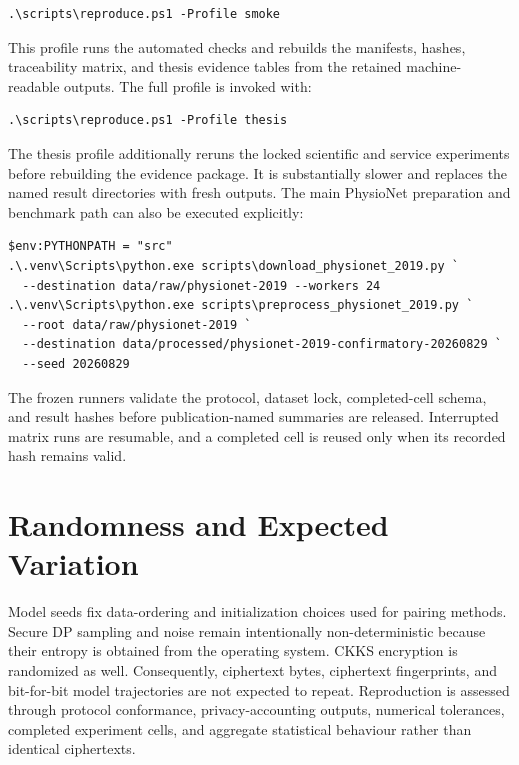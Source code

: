 \begin{verbatim}
.\scripts\reproduce.ps1 -Profile smoke
\end{verbatim}

This profile runs the automated checks and rebuilds the manifests, hashes, traceability matrix, and thesis evidence tables from the retained machine-readable outputs. The full profile is invoked with:

\begin{verbatim}
.\scripts\reproduce.ps1 -Profile thesis
\end{verbatim}

The thesis profile additionally reruns the locked scientific and service experiments before rebuilding the evidence package. It is substantially slower and replaces the named result directories with fresh outputs. The main PhysioNet preparation and benchmark path can also be executed explicitly:

\begin{verbatim}
$env:PYTHONPATH = "src"
.\.venv\Scripts\python.exe scripts\download_physionet_2019.py `
  --destination data/raw/physionet-2019 --workers 24
.\.venv\Scripts\python.exe scripts\preprocess_physionet_2019.py `
  --root data/raw/physionet-2019 `
  --destination data/processed/physionet-2019-confirmatory-20260829 `
  --seed 20260829
\end{verbatim}

The frozen runners validate the protocol, dataset lock, completed-cell schema, and result hashes before publication-named summaries are released. Interrupted matrix runs are resumable, and a completed cell is reused only when its recorded hash remains valid.

\section{Randomness and Expected Variation}
\label{appsec:randomness-variation}

Model seeds fix data-ordering and initialization choices used for pairing methods. Secure DP sampling and noise remain intentionally non-deterministic because their entropy is obtained from the operating system. CKKS encryption is randomized as well. Consequently, ciphertext bytes, ciphertext fingerprints, and bit-for-bit model trajectories are not expected to repeat. Reproduction is assessed through protocol conformance, privacy-accounting outputs, numerical tolerances, completed experiment cells, and aggregate statistical behaviour rather than identical ciphertexts.

